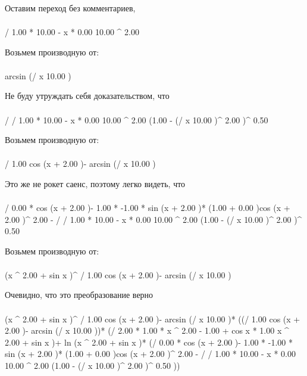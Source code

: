 Оставим переход без комментариев, 
\begin{gather}
\end{gather}
\begin{}
/ {1.00 * 10.00 - x * 0.00 }{10.00 ^ {2.00 }}\\
\end{}
Возьмем производную от:
\begin{gather}
\end{gather}
\begin{}
arcsin (/ {x }{10.00 })\\
\end{}
Не буду утруждать себя доказательством, что
\begin{gather}
\end{gather}
\begin{}
/ {/ {1.00 * 10.00 - x * 0.00 }{10.00 ^ {2.00 }}}{(1.00 - (/ {x }{10.00 })^ {2.00 })^ {0.50 }}\\
\end{}
Возьмем производную от:
\begin{gather}
\end{gather}
\begin{}
/ {1.00 }{cos (x + 2.00 )}- arcsin (/ {x }{10.00 })\\
\end{}
Это же не рокет саенс, поэтому легко видеть, что
\begin{gather}
\end{gather}
\begin{}
/ {0.00 * cos (x + 2.00 )- 1.00 * -1.00 * sin (x + 2.00 )* (1.00 + 0.00 )}{cos (x + 2.00 )^ {2.00 }}- / {/ {1.00 * 10.00 - x * 0.00 }{10.00 ^ {2.00 }}}{(1.00 - (/ {x }{10.00 })^ {2.00 })^ {0.50 }}\\
\end{}
Возьмем производную от:
\begin{gather}
\end{gather}
\begin{}
(x ^ {2.00 }+ sin x )^ {/ {1.00 }{cos (x + 2.00 )}- arcsin (/ {x }{10.00 })}\\
\end{}
Очевидно, что это преобразование верно
\begin{gather}
\end{gather}
\begin{}
(x ^ {2.00 }+ sin x )^ {/ {1.00 }{cos (x + 2.00 )}- arcsin (/ {x }{10.00 })}* ((/ {1.00 }{cos (x + 2.00 )}- arcsin (/ {x }{10.00 }))* (/ {2.00 * 1.00 * x ^ {2.00 - 1.00 }+ cos x * 1.00 }{x ^ {2.00 }+ sin x })+ ln (x ^ {2.00 }+ sin x )* (/ {0.00 * cos (x + 2.00 )- 1.00 * -1.00 * sin (x + 2.00 )* (1.00 + 0.00 )}{cos (x + 2.00 )^ {2.00 }}- / {/ {1.00 * 10.00 - x * 0.00 }{10.00 ^ {2.00 }}}{(1.00 - (/ {x }{10.00 })^ {2.00 })^ {0.50 }}))\\
\end{}
